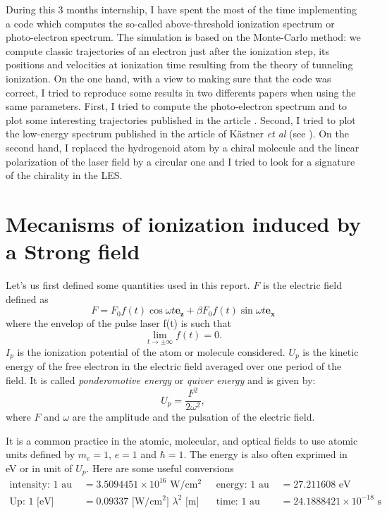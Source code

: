 \documentclass[a4paper]{article}
\begin{document}
\par
During this 3 months internship, I have spent the most of the time implementing a code which computes the so-called above-threshold ionization spectrum or photo-electron spectrum. The simulation is based on the Monte-Carlo method: we compute classic trajectories of an electron just after the ionization step, its positions and velocities at ionization time resulting from the theory of tunneling ionization. 
On the one hand, with a view to making sure that the code was correct, I tried to reproduce some results in two differents papers when using the same parameters. First, I tried to compute the photo-electron spectrum and to plot some interesting trajectories published in the article \cite{Hu_1997}. Second, I tried to plot the low-energy spectrum published in the article of K\"astner \textit{et al} (see \cite{Kastner_2012}).
On the second hand, I replaced the hydrogenoid atom by a chiral molecule and the linear polarization of the laser field by a circular one and I tried to look for a signature of the chirality in the LES.



\section{Mecanisms of ionization induced by a Strong field}
Let's us first defined some quantities used in this report. $F$ is the electric field defined as
\begin{equation}
F=F_{0} f(t)\cos{\omega t} \mathbf{e_{z}} + \beta F_{0} f(t)\sin{\omega t} \mathbf{e_{x}}
\end{equation}
where the envelop of the pulse laser f(t) is such that
\begin{equation}
\label{envelop}
 \lim_{t\to\pm\infty} f(t)=0.
\end{equation}
$I_{p}$ is the ionization potential of the atom or molecule considered. $U_{p}$ is the kinetic energy of the free electron in the electric field averaged over one period of the field. It is called \textit{ponderomotive energy} or \textit{quiver energy} and is given by:
\begin{equation}
U_{p}=\frac{F^{2}}{2\omega^{2}},
\end{equation}  
where $F$ and $\omega$ are the amplitude and the pulsation of the electric field.

It is a common practice in the atomic, molecular, and optical fields to use atomic units defined by $m_{e}=1$, $e=1$ and $\hbar=1$. The energy is also often exprimed in eV or in unit of $U_{p}$. Here are some useful conversions
\begin{align*}
\text{intensity: } 1 \text{ au } & = 3.5094451\times10^{16} \text{ W/cm$^{2}$ }  &\text{energy: } 1 \text{ au }&= 27.211608 \text{ eV} \\
\text{Up: } 1\text{ [eV]} &= 0.09337 \text{ [W/cm$^{2}$] }\lambda^{2}\text{ [m] } &\text{time: } 1 \text{ au }&=24.1888421\times10^{-18} \text{ s} 
\end{align*}
\end{document}

